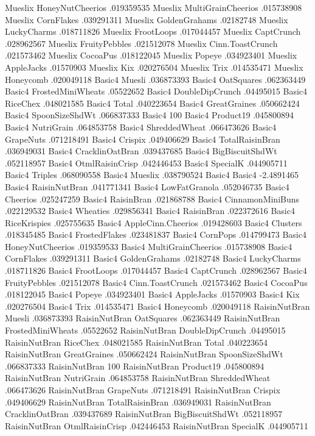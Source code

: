 Mueslix	HoneyNutCheerios	.019359535
Mueslix	MultiGrainCheerios	.015738908
Mueslix	CornFlakes	.039291311
Mueslix	GoldenGrahams	.02182748
Mueslix	LuckyCharms	.018711826
Mueslix	FrootLoops	.017044457
Mueslix	CaptCrunch	.028962567
Mueslix	FruityPebbles	.021512078
Mueslix	Cinn.ToastCrunch	.021573462
Mueslix	CocoaPus	.018122045
Mueslix	Popeye	.034923401
Mueslix	AppleJacks	.01570903
Mueslix	Kix	.020276504
Mueslix	Trix	.014535471
Mueslix	Honeycomb	.020049118
Basic4	Muesli	.036873393
Basic4	OatSquares	.062363449
Basic4	FrostedMiniWheats	.05522652
Basic4	DoubleDipCrunch	.04495015
Basic4	RiceChex	.048021585
Basic4	Total	.040223654
Basic4	GreatGraines	.050662424
Basic4	SpoonSizeShdWt	.066837333
Basic4	100%
Basic4	Product19	.045800894
Basic4	NutriGrain	.064853758
Basic4	ShreddedWheat	.066473626
Basic4	GrapeNuts	.071218491
Basic4	Crispix	.049406629
Basic4	TotalRaisinBran	.036949031
Basic4	CracklinOatBran	.039437685
Basic4	BigBiscuitShdWt	.052118957
Basic4	OtmlRaisinCrisp	.042446453
Basic4	SpecialK	.044905711
Basic4	Triples	.068090558
Basic4	Mueslix	.038790524
Basic4	Basic4	-2.4891465
Basic4	RaisinNutBran	.041771341
Basic4	LowFatGranola	.052046735
Basic4	Cheerios	.025247259
Basic4	RaisinBran	.021868788
Basic4	CinnamonMiniBuns	.022129532
Basic4	Wheaties	.029856341
Basic4	RaisinBran	.022372616
Basic4	RiceKrispies	.025755635
Basic4	AppleCinn.Cheerios	.019428603
Basic4	Clusters	.018345485
Basic4	FrostedFlakes	.023481837
Basic4	CornPops	.014799473
Basic4	HoneyNutCheerios	.019359533
Basic4	MultiGrainCheerios	.015738908
Basic4	CornFlakes	.039291311
Basic4	GoldenGrahams	.02182748
Basic4	LuckyCharms	.018711826
Basic4	FrootLoops	.017044457
Basic4	CaptCrunch	.028962567
Basic4	FruityPebbles	.021512078
Basic4	Cinn.ToastCrunch	.021573462
Basic4	CocoaPus	.018122045
Basic4	Popeye	.034923401
Basic4	AppleJacks	.01570903
Basic4	Kix	.020276504
Basic4	Trix	.014535471
Basic4	Honeycomb	.020049118
RaisinNutBran	Muesli	.036873393
RaisinNutBran	OatSquares	.062363449
RaisinNutBran	FrostedMiniWheats	.05522652
RaisinNutBran	DoubleDipCrunch	.04495015
RaisinNutBran	RiceChex	.048021585
RaisinNutBran	Total	.040223654
RaisinNutBran	GreatGraines	.050662424
RaisinNutBran	SpoonSizeShdWt	.066837333
RaisinNutBran	100%
RaisinNutBran	Product19	.045800894
RaisinNutBran	NutriGrain	.064853758
RaisinNutBran	ShreddedWheat	.066473626
RaisinNutBran	GrapeNuts	.071218491
RaisinNutBran	Crispix	.049406629
RaisinNutBran	TotalRaisinBran	.036949031
RaisinNutBran	CracklinOatBran	.039437689
RaisinNutBran	BigBiscuitShdWt	.052118957
RaisinNutBran	OtmlRaisinCrisp	.042446453
RaisinNutBran	SpecialK	.044905711
